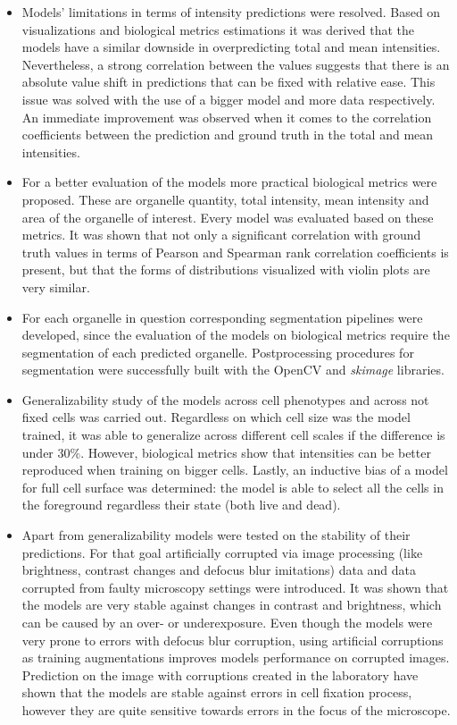 \begin{itemize}
    \item Models' limitations in terms of intensity predictions were resolved. Based on visualizations and biological metrics estimations it was derived that the models have a similar downside in overpredicting total and mean intensities. Nevertheless, a strong correlation between the values suggests that there is an absolute value shift in predictions that can be fixed with relative ease. This issue was solved with the use of a bigger model and more data respectively. An immediate improvement was observed when it comes to the correlation coefficients between the prediction and ground truth in the total and mean intensities.
    
    \item For a better evaluation of the models more practical biological metrics were proposed. These are organelle quantity, total intensity, mean intensity and area of the organelle of interest. Every model was evaluated based on these metrics. It was shown that not only a significant correlation with ground truth values in terms of Pearson and Spearman rank correlation coefficients is present, but that the forms of distributions visualized with violin plots are very similar.
    
    \item For each organelle in question corresponding segmentation pipelines were developed, since the evaluation of the models on biological metrics require the segmentation of each predicted organelle. Postprocessing procedures for segmentation were successfully built with the OpenCV and \textit{skimage} libraries. 
    
    \item Generalizability study of the models across cell phenotypes and across not fixed cells was carried out. Regardless on which cell size was the model trained, it was able to generalize across different cell scales if the difference is under $30\%$. However, biological metrics show that intensities can be better reproduced when training on bigger cells. Lastly, an inductive bias of a model for full cell surface was determined: the model is able to select all the cells in the foreground regardless their state (both live and dead).

    \item Apart from generalizability models were tested on the stability of their predictions. For that goal artificially corrupted via image processing (like brightness, contrast changes and defocus blur imitations) data and data corrupted from faulty microscopy settings were introduced. It was shown that the models are very stable against changes in contrast and brightness, which can be caused by an over- or underexposure. Even though the models were very prone to errors with defocus blur corruption, using artificial corruptions as training augmentations improves models performance on corrupted images. Prediction on the image with corruptions created in the laboratory have shown that the models are stable against errors in cell fixation process, however they are quite sensitive towards errors in the focus of the microscope.
    

\end{itemize}
